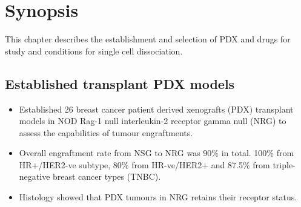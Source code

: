 
\section{Synopsis}
This chapter describes the establishment and selection of PDX and drugs for study and conditions for single cell dissociation. 
 
 
 \subsection{Established transplant PDX models}
 \begin{itemize}
  \item Established 26 breast cancer patient derived xenografts (PDX) transplant models in NOD Rag-1 null interleukin-2 receptor gamma null (NRG) to assess the capabilities of tumour engraftments. 
  \item Overall engraftment rate from NSG to NRG was 90\% in total. 100\% from HR+/HER2-ve subtype,  80\% from HR-ve/HER2+ and 87.5\% from triple-negative breast cancer types (TNBC).
   \item Histology showed that PDX tumours in NRG retains their receptor status.
  
  \end{itemize}
  
